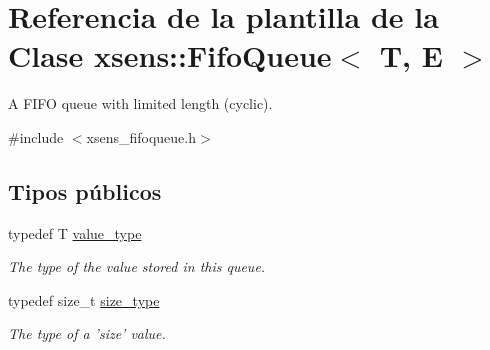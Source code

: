 \hypertarget{classxsens_1_1FifoQueue}{\section{\-Referencia de la plantilla de la \-Clase xsens\-:\-:\-Fifo\-Queue$<$ \-T, \-E $>$}
\label{classxsens_1_1FifoQueue}
}


\-A \-F\-I\-F\-O queue with limited length (cyclic).  




{\ttfamily \#include $<$xsens\-\_\-fifoqueue.\-h$>$}

\subsection*{\-Tipos públicos}
\begin{DoxyCompactItemize}
\item 
\hypertarget{classxsens_1_1FifoQueue_a61949842c92df50f702496096b9d5069}{typedef \-T \hyperlink{classxsens_1_1FifoQueue_a61949842c92df50f702496096b9d5069}{value\-\_\-type}}\label{classxsens_1_1FifoQueue_a61949842c92df50f702496096b9d5069}

\begin{DoxyCompactList}\small\item\em \-The type of the value stored in this queue. \end{DoxyCompactList}\item 
\hypertarget{classxsens_1_1FifoQueue_a6a595ab989816ba96cf0cbfa4d39b0b1}{typedef size\-\_\-t \hyperlink{classxsens_1_1FifoQueue_a6a595ab989816ba96cf0cbfa4d39b0b1}{size\-\_\-type}}\label{classxsens_1_1FifoQueue_a6a595ab989816ba96cf0cbfa4d39b0b1}

\begin{DoxyCompactList}\small\item\em \-The type of a 'size' value. \end{DoxyCompactList}\end{DoxyCompactItemize}
